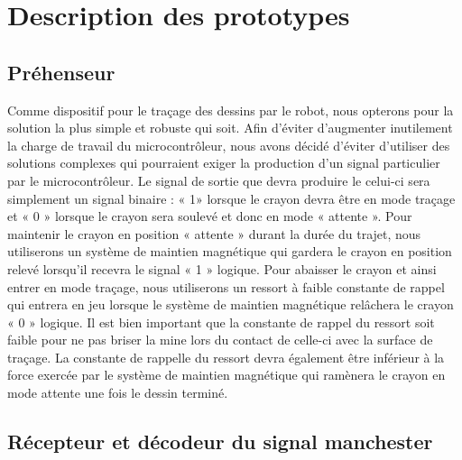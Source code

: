 


\chapter{Description des prototypes}
\label{s:prototypes}
\section{Préhenseur}

Comme dispositif pour le traçage des dessins par le robot, nous opterons pour la solution la plus simple et robuste qui soit. Afin d’éviter d’augmenter inutilement la charge de travail du microcontrôleur, nous avons décidé d’éviter d’utiliser des solutions complexes qui pourraient exiger la production d’un signal particulier par le microcontrôleur. Le signal de sortie que devra produire le celui-ci sera simplement un signal binaire : « 1» lorsque le crayon devra être en mode traçage et « 0 » lorsque le crayon sera soulevé et donc en mode « attente ». Pour maintenir le crayon en position « attente » durant la durée du trajet, nous utiliserons un système de maintien magnétique qui gardera le crayon en position relevé lorsqu’il recevra le signal « 1 » logique. Pour abaisser le crayon et ainsi entrer en mode traçage, nous utiliserons un ressort à faible constante de rappel qui entrera en jeu lorsque le système de maintien magnétique relâchera le crayon « 0 » logique. Il est bien important que la constante de rappel du ressort soit faible pour ne pas briser la mine lors du contact de celle-ci avec la surface de traçage. La constante de rappelle du ressort devra également être inférieur à la force exercée par le système de maintien magnétique qui ramènera le crayon en mode attente une fois le dessin terminé.

\section{Récepteur et décodeur du signal manchester}

